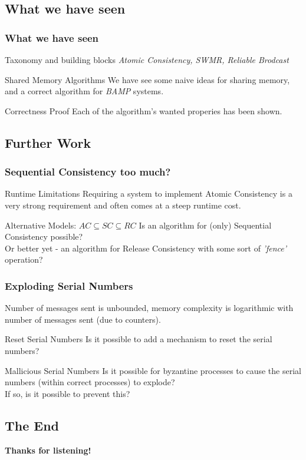 \subsection{What we have seen}
\begin{frame}
    \frametitle{What we have seen}
    \begin{block}{Taxonomy and building blocks}
        \emph{Atomic Consistency, SWMR, Reliable Brodcast}
    \end{block}
    \begin{block}{Shared Memory Algorithms}
        We have see some naive ideas for sharing memory, and a correct algorithm for \emph{BAMP} systems.
    \end{block}
    \begin{block}{Correctness Proof}
        Each of the algorithm's wanted properies has been shown.
    \end{block}
\end{frame}

\subsection{Further Work}
\begin{frame}
    \frametitle{Sequential Consistency too much?}
    \begin{alertblock}{Runtime Limitations}
        Requiring a system to implement Atomic Consistency is a very strong requirement
        and often comes at a steep runtime cost.
    \end{alertblock}
    \begin{block}{Alternative Models: $AC\subseteq SC\subseteq RC$}
        Is an algorithm for (only) Sequential Consistency possible?\\
        Or better yet - an algorithm for Release Consistency with some sort of
        \emph{'fence'} operation?
    \end{block}
\end{frame}

\begin{frame}
    \frametitle{Exploding Serial Numbers}
    Number of messages sent is unbounded, memory complexity
    is logarithmic with number of messages sent (due to counters).
    \begin{block}{Reset Serial Numbers}
        Is it possible to add a mechanism to reset the serial numbers?
    \end{block}
    \begin{block}{Mallicious Serial Numbers}
        Is it possible for byzantine processes to cause the serial numbers (within correct processes) to explode?\\
        If so, is it possible to prevent this?
    \end{block}
\end{frame}

\subsection{The End}
\begin{frame}
    \begin{center}
        \textbf{Thanks for listening!}
    \end{center}
\end{frame}